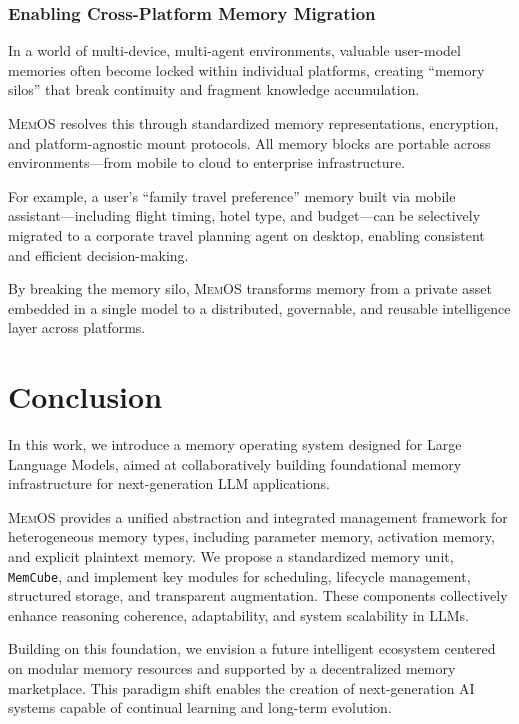 \documentclass[]{memtensor}
\begin{document}
\subsubsection{Enabling Cross-Platform Memory Migration}

In a world of multi-device, multi-agent environments, valuable user-model memories often become locked within individual platforms, creating “memory silos” that break continuity and fragment knowledge accumulation.

\textsc{MemOS} resolves this through standardized memory representations, encryption, and platform-agnostic mount protocols. All memory blocks are portable across environments—from mobile to cloud to enterprise infrastructure.

For example, a user’s “family travel preference” memory built via mobile assistant—including flight timing, hotel type, and budget—can be selectively migrated to a corporate travel planning agent on desktop, enabling consistent and efficient decision-making.

By breaking the memory silo, \textsc{MemOS} transforms memory from a private asset embedded in a single model to a distributed, governable, and reusable intelligence layer across platforms.

\section{Conclusion}
In this work, we introduce a memory operating system designed for Large Language Models, aimed at collaboratively building foundational memory infrastructure for next-generation LLM applications.

\textsc{MemOS} provides a unified abstraction and integrated management framework for heterogeneous memory types, including parameter memory, activation memory, and explicit plaintext memory. We propose a standardized memory unit, \texttt{MemCube}, and implement key modules for scheduling, lifecycle management, structured storage, and transparent augmentation. These components collectively enhance reasoning coherence, adaptability, and system scalability in LLMs.

Building on this foundation, we envision a future intelligent ecosystem centered on modular memory resources and supported by a decentralized memory marketplace. This paradigm shift enables the creation of next-generation AI systems capable of continual learning and long-term evolution.
\end{document}
